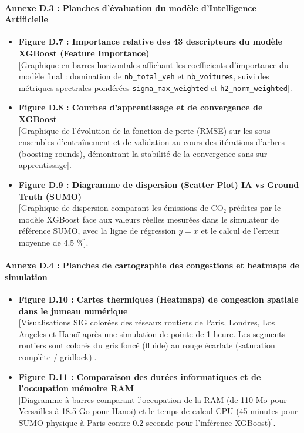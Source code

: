 \documentclass[11pt, a4paper]{article}
\providecommand{\tightlist}{}
\begin{document}
\paragraph{Annexe D.3 : Planches d'évaluation du modèle d'Intelligence
Artificielle}\label{annexe-d.3-planches-duxe9valuation-du-moduxe8le-dintelligence-artificielle}

\begin{itemize}
\tightlist
\item
  \textbf{Figure D.7 : Importance relative des 43 descripteurs du modèle
  XGBoost (Feature Importance)}\\
  {[}Graphique en barres horizontales affichant les coefficients
  d'importance du modèle final : domination de \texttt{nb\_total\_veh}
  et \texttt{nb\_voitures}, suivi des métriques spectrales pondérées
  \texttt{sigma\_max\_weighted} et \texttt{h2\_norm\_weighted}{]}.
\item
  \textbf{Figure D.8 : Courbes d'apprentissage et de convergence de
  XGBoost}\\
  {[}Graphique de l'évolution de la fonction de perte (RMSE) sur les
  sous-ensembles d'entraînement et de validation au cours des itérations
  d'arbres (boosting rounds), démontrant la stabilité de la convergence
  sans sur-apprentissage{]}.
\item
  \textbf{Figure D.9 : Diagramme de dispersion (Scatter Plot) IA vs
  Ground Truth (SUMO)}\\
  {[}Graphique de dispersion comparant les émissions de CO₂ prédites par
  le modèle XGBoost face aux valeurs réelles mesurées dans le simulateur
  de référence SUMO, avec la ligne de régression \(y=x\) et le calcul de
  l'erreur moyenne de 4.5 \%{]}.
\end{itemize}

\paragraph{Annexe D.4 : Planches de cartographie des congestions et
heatmaps de
simulation}\label{annexe-d.4-planches-de-cartographie-des-congestions-et-heatmaps-de-simulation}

\begin{itemize}
\tightlist
\item
  \textbf{Figure D.10 : Cartes thermiques (Heatmaps) de congestion
  spatiale dans le jumeau numérique}\\
  {[}Visualisations SIG colorées des réseaux routiers de Paris, Londres,
  Los Angeles et Hanoï après une simulation de pointe de 1 heure. Les
  segments routiers sont colorés du gris foncé (fluide) au rouge
  écarlate (saturation complète / gridlock){]}.
\item
  \textbf{Figure D.11 : Comparaison des durées informatiques et de
  l'occupation mémoire RAM}\\
  {[}Diagramme à barres comparant l'occupation de la RAM (de 110 Mo pour
  Versailles à 18.5 Go pour Hanoï) et le temps de calcul CPU (45 minutes
  pour SUMO physique à Paris contre 0.2 seconde pour l'inférence
  XGBoost){]}.
\end{itemize}
\end{document}
